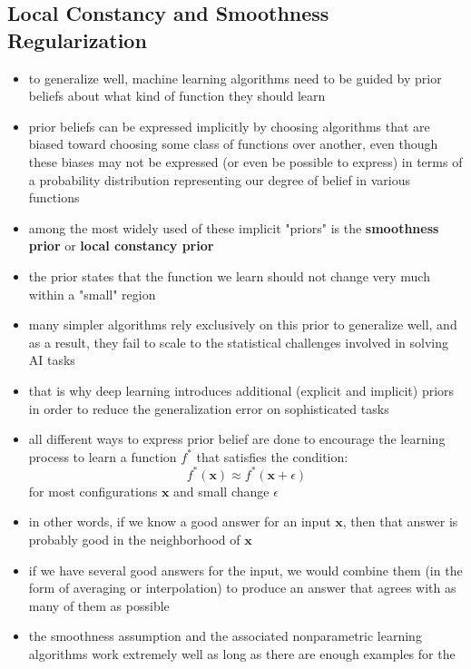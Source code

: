 \documentclass[11pt, twocolumn]{report}
\begin{document}
\subsection{Local Constancy and Smoothness Regularization}
\begin{itemize}
  \item to generalize well, machine learning algorithms need to be guided by
    prior beliefs about what kind of function they should learn
  \item prior beliefs can be expressed implicitly by choosing algorithms that
    are biased toward choosing some class of functions over another, even
    though these biases may not be expressed (or even be possible to express)
    in terms of a probability distribution representing our degree of belief in
    various functions
  \item among the most widely used of these implicit "priors" is the
    \textbf{smoothness prior} or \textbf{local constancy prior}
  \item the prior states that the function we learn should not change very much
    within a "small" region
  \item many simpler algorithms rely exclusively on this prior to generalize
    well, and as a result, they fail to scale to the statistical challenges
    involved in solving AI tasks
  \item that is why deep learning introduces additional (explicit and implicit)
    priors in order to reduce the generalization error on sophisticated tasks
  \item all different ways to express prior belief are done to encourage the
    learning process to learn a function $f^*$ that satisfies the condition:
    \begin{equation}
      f^*(\bm{x}) \approx f^*(\bm{x} + \epsilon)
    \end{equation}
    for most configurations $\bm{x}$ and small change $\epsilon$
  \item in other words, if we know a good answer for an input $\bm{x}$, then
    that answer is probably good in the neighborhood of $\bm{x}$
  \item if we have several good answers for the input, we would combine them
    (in the form of averaging or interpolation) to produce an answer that
    agrees with as many of them as possible
  \item the smoothness assumption and the associated nonparametric learning
    algorithms work extremely well as long as there are enough examples for the

\end{itemize}
\end{document}
